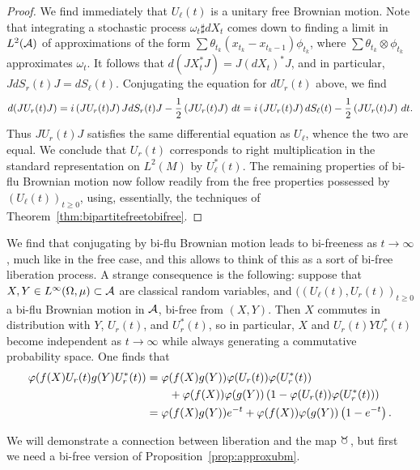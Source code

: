 \begin{proof}
	We find immediately that $U_\ell(t)$ is a unitary free Brownian motion.
	Note that integrating a stochastic process $\omega_t\sharp dX_t$ comes down to finding a limit in $L^2(\mathcal{A})$ of approximations of the form $\sum \theta_{t_k}(x_{t_k}-x_{t_k-1})\phi_{t_k}$, where $\sum \theta_{t_k}\otimes \phi_{t_k}$ approximates $\omega_t$.
	It follows that $d(JX_t^*J) = J(dX_t)^*J$, and in particular, $JdS_r(t)J = dS_\ell(t)$.
	Conjugating the equation for $dU_r(t)$ above, we find
	$$
	d(JU_r(t)J)
	= i\left(JU_r(t)J\right)JdS_r(t)J - \frac12\left(JU_r(t)J\right)\,dt 
	= i\left(JU_r(t)J\right)dS_\ell(t) - \frac12\left(JU_r(t)J\right)\,dt.
	$$
	Thus $JU_r(t)J$ satisfies the same differential equation as $U_\ell$, whence the two are equal.
	We conclude that $U_r(t)$ corresponds to right multiplication in the standard representation on $L^2(M)$ by $U_\ell^*(t)$.
	The remaining properties of bi-flu Brownian motion now follow readily from the free properties possessed by $(U_\ell(t))_{t\geq0}$, using, essentially, the techniques of Theorem~\ref{thm:bipartitefreetobifree}.
\end{proof}

We find that conjugating by bi-flu Brownian motion leads to bi-freeness as $t\to\infty$, much like in the free case, and this allows to think of this as a sort of bi-free liberation process.
A strange consequence is the following: suppose that $X, Y \in L^\infty(\Omega, \mu) \subset \mathcal{A}$ are classical random variables, and $((U_\ell(t), U_r(t))_{t\geq 0}$ a bi-flu Brownian motion in $\mathcal{A}$, bi-free from $(X, Y)$.
Then $X$ commutes in distribution with $Y$, $U_r(t)$, and $U_r^*(t)$, so in particular, $X$ and $U_r(t)YU_r^*(t)$ become independent as $t\to\infty$ while always generating a commutative probability space.
One finds that
\begin{align*}
	\varphi(f(X)U_r(t)g(Y)U_r^*(t))
	&= \varphi(f(X)g(Y))\varphi(U_r(t))\varphi(U_r^*(t)) \\
	&\qquad+ \varphi(f(X))\varphi(g(Y))\left(1-\varphi(U_r(t))\varphi(U_r^*(t))\right) \\
	&= \varphi(f(X)g(Y))e^{-t} + \varphi(f(X))\varphi(g(Y))\left(1-e^{-t}\right).
\end{align*}

We will demonstrate a connection between liberation and the map $\taur$, but first we need a bi-free version of Proposition~\ref{prop:approxubm}.


